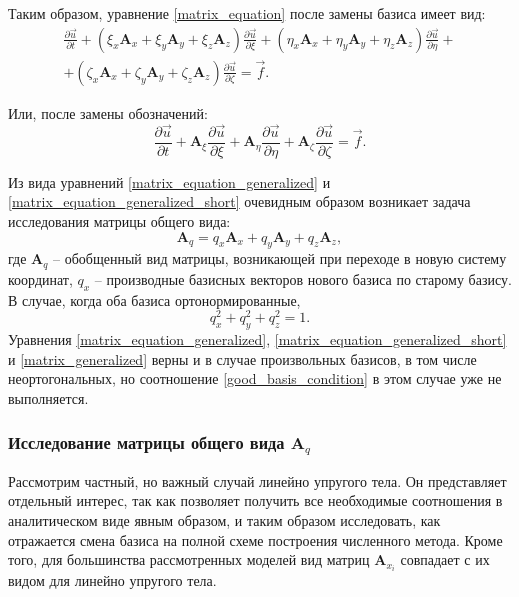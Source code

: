 Таким образом, уравнение \eqref{matrix_equation} после замены базиса имеет вид:
\begin{align}
\label{matrix_equation_generalized}
\frac{\partial\vec{u}}{\partial{t}} + 
( \xi_x \mathbf{A}_x  + \xi_y \mathbf{A}_y + \xi_z \mathbf{A}_z ) \frac{\partial\vec{u}}{\partial{\xi}} + 
( \eta_x \mathbf{A}_x + \eta_y \mathbf{A}_y + \eta_z \mathbf{A}_z ) \frac{\partial\vec{u}}{\partial{\eta}} + \nonumber\\
+ ( \zeta_x \mathbf{A}_x  + \zeta_y \mathbf{A}_y + \zeta_z \mathbf{A}_z ) \frac{\partial\vec{u}}{\partial{\zeta}} = \vec f.
\end{align}

Или, после замены обозначений:
\begin{equation}
\label{matrix_equation_generalized_short}
\frac{\partial\vec{u}}{\partial{t}} + \mathbf{A}_\xi \frac{\partial\vec{u}}{\partial{\xi}} + 
\mathbf{A}_\eta \frac{\partial\vec{u}}{\partial{\eta}} + \mathbf{A}_\zeta \frac{\partial\vec{u}}{\partial{\zeta}} = \vec f.
\end{equation}

Из вида уравнений \eqref{matrix_equation_generalized} и \eqref{matrix_equation_generalized_short} очевидным образом возникает задача исследования матрицы общего вида:
\begin{equation}
\label{matrix_generalized}
\mathbf{A}_q = q_x \mathbf{A}_x  + q_y \mathbf{A}_y + q_z \mathbf{A}_z,
\end{equation}
где $\mathbf{A}_q$ -- обобщенный вид матрицы, возникающей при переходе в новую систему координат, $q_x$ -- производные базисных векторов нового базиса по старому базису. В случае, когда оба базиса ортонормированные,
\begin{equation}
\label{good_basis_condition}
q_x^2 + q_y^2 + q_z^2 = 1.
\end{equation}
Уравнения \eqref{matrix_equation_generalized}, \eqref{matrix_equation_generalized_short} и \eqref{matrix_generalized} верны и в случае произвольных базисов, в том числе неортогональных, но соотношение \eqref{good_basis_condition} в этом случае уже не выполняется.

\subsubsection{Исследование матрицы общего вида $\mathbf{A}_q$}

Рассмотрим частный, но важный случай линейно упругого тела. Он представляет отдельный интерес, так как позволяет получить все необходимые соотношения в аналитическом виде явным образом, и таким образом исследовать, как отражается смена базиса на полной схеме построения численного метода. Кроме того, для большинства рассмотренных моделей вид матриц $\mathbf A_{x_i}$ совпадает с их видом для линейно упругого тела.


